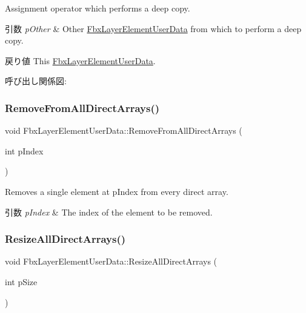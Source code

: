 Assignment operator which performs a deep copy. 
\begin{DoxyParams}{引数}
{\em p\+Other} & Other \hyperlink{class_fbx_layer_element_user_data}{Fbx\+Layer\+Element\+User\+Data} from which to perform a deep copy. \\
\hline
\end{DoxyParams}
\begin{DoxyReturn}{戻り値}
This \hyperlink{class_fbx_layer_element_user_data}{Fbx\+Layer\+Element\+User\+Data}. 
\end{DoxyReturn}
呼び出し関係図\+:
\mbox{\label{class_fbx_layer_element_user_data_a2a086bdb717ea023b9bfb6cab66f23d4}} 
\subsubsection{\texorpdfstring{Remove\+From\+All\+Direct\+Arrays()}{RemoveFromAllDirectArrays()}}
{\footnotesize\ttfamily void Fbx\+Layer\+Element\+User\+Data\+::\+Remove\+From\+All\+Direct\+Arrays (\begin{DoxyParamCaption}\item[{int}]{p\+Index }\end{DoxyParamCaption})}

Removes a single element at p\+Index from every direct array. 
\begin{DoxyParams}{引数}
{\em p\+Index} & The index of the element to be removed. \\
\hline
\end{DoxyParams}
\mbox{\label{class_fbx_layer_element_user_data_a8d6ab3a926c28cc793dbfabde35ab598}} 
\subsubsection{\texorpdfstring{Resize\+All\+Direct\+Arrays()}{ResizeAllDirectArrays()}}
{\footnotesize\ttfamily void Fbx\+Layer\+Element\+User\+Data\+::\+Resize\+All\+Direct\+Arrays (\begin{DoxyParamCaption}\item[{int}]{p\+Size }\end{DoxyParamCaption})}


